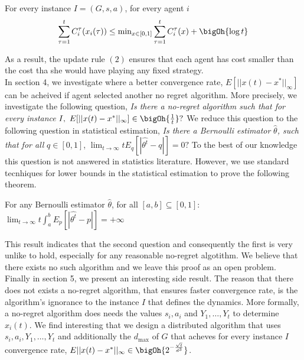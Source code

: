 \begin{theorem}
For every instance $I=(G,s,a)$, for every agent $i$ $$\sum_{\tau=1}^tC_i^\tau(x_i(\tau)) \leq \text{min}_{x \in [0,1]}\sum_{\tau=1}^tC_i^\tau(x) + \bigOh{\log t}$$ 
\end{theorem}
As a result, the update rule $(2)$ ensures that each agent has cost smaller than the cost tha she would have playing any fixed strategy.\\


In section 4, we investigate where a better convergence rate, $E[||x(t)-x^*||_{\infty}]$ can be acheived if agent selected another no regret algorithm. More precisely, we investigate the following question, \emph{Is there a no-regret algorithm such that for every instance } $I,~E[||x(t)-x^*||_{\infty}] \in \bigOh{\frac{1}{t}}?$  We reduce this question to the following question in statistical estimation, \emph{Is there a Bernoulli estimator }$\hat{\theta}$\emph{, such that for all }$q \in [0,1]$, $\lim_{t \rightarrow \infty} t E_q[|\hat{\theta^t} -q|]=0?$  To the best of our knowledge this question is not answered in statistics literature. However, we use standard tecnhiques for lower bounds in the statistical estimation to prove the following theorem.
\begin{theorem}
For any Bernoulli estimator $\hat{\theta}$, for all $[a,b] \subseteq [0,1]:~$ $\lim_{t \rightarrow \infty}t \int_{a}^bE_p[|\hat{\theta^t} -p|]= +\infty$
\end{theorem}
\noindent This result indicates that the second question and consequently the first is very unlike to hold, especially for any reasonable no-regret algotithm. We believe that there exists no such algorithm and we leave this proof as an open problem.\\

Finally in section 5, we present an interesting side result. The reason that there does not exists a no-regret algorithm, that ensures faster convergence rate, is the algorithm's ignorance to the instance $I$ that defines the dynamics. More formally, a no-regret algorithm does needs the values $s_i,a_i$ and $Y_1,\ldots,Y_t$ to determine $x_i(t)$. We find interesting that we design a distributed algorithm that uses $s_i,a_i,Y_1,\ldots,Y_t$ and additionally the $d_\text{max}$ of $G$ that acheves for every instance $I$ convergence rate, $E||x(t)-x^*||_{\infty} \in \bigOh{2^{-\frac{\sqrt{t}}{d^3}}}$.   






